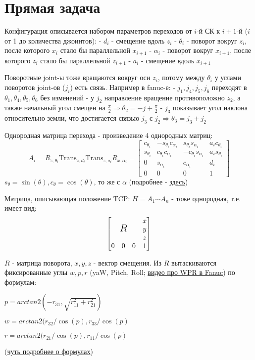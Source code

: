 \documentclass{article}
\begin{document}
\section{Прямая задача}

Конфигурация описывается набором параметров переходов от $i$-й СК к $i+1$-й ($i$ от 1 до количества джоинтов):
- $d_i$ - смещение вдоль $z_i$
- $\theta_i$ - поворот вокруг $z_i$, после которого $x_i$ стало бы параллельной $x_{i+1}$
- $\alpha_i$ - поворот вокруг $x_{i+1}$, после которого $z_i$ стало бы параллельной $z_{i+1}$
- $a_i$ - смещение вдоль $x_{i+1}$

Поворотные joint-ы тоже вращаются вокруг оси $z_i$, потому между $\theta_i$ у углами поворотов joint-ов ($j_i$) есть связь. Например в fanuc-е: 
- $j_1, j_4, j_5, j_6$ переходят в $\theta_1, \theta_4,\theta_5,\theta_6$ без изменений
- у $j_2$ направление вращение противоположно $z_2$, а также начальный угол смещен на $\frac{\pi}{2}\Rightarrow \theta_2=-j + \frac{\pi}{2}$
- $j_3$ показывает угол наклона относительно земли, что достигается связью $j_3$ с $j_2\Rightarrow \theta_3=j_3+j_2$

Однородная матрица перехода - произведение 4 однородных матриц: $$A_i = R_{z, \theta_i}\text{Trans}_{z, d_i}\text{Trans}_{z, a_i}R_{x,\alpha_i}=\begin{bmatrix}
c_{\theta_i} & -s_{\theta_i} c_{\alpha_i} & s_{\theta_i}s_{\alpha_i} & a_ic_{\theta_i}\\
s_{\theta_i} & c_{\theta_i} c_{\alpha_i} & -c_{\theta_i}s_{\alpha_i} & a_is_{\theta_i}\\
0 & s_{\alpha_i} & c_{\alpha_i} & d_i \\
0 & 0 & 0 & 1
\end{bmatrix}$$
$s_{\theta}=\sin(\theta), c_{\theta}=\cos(\theta)$, то же с $\alpha$ (подробнее - \href{https://uynitsuj.github.io/articles/2020-03/forward-kinematics-denavit-hartenberg-convention-on-a-6r-robotic-arm-example}{здесь})

Матрица, описывающая положение TCP: $H = A_1\cdots A_n$ - тоже однородная, т.е. имеет вид:
$$
\begin{bmatrix}
\text{\Large$R$}&\begin{matrix} x \\ y \\ z \end{matrix}\\
\begin{matrix} 0 & 0 & 0 \end{matrix} & 1
\end{bmatrix}
$$

$R$ - матрица поворота, $x, y, z$ - вектор смещения. Из $R$ вытаскиваются фиксированные углы $w, p, r$ (yaW, Pitch, Roll; \href{https://youtu.be/Ft7L5EsF_Kw?t=479}{видео про WPR в Fanuc}) по формулам:

$p=arctan2(-r_{31}, \sqrt{r_{11}^2+r_{21}^2})$

$w=arctan2(r_{32}/\cos(p), r_{33}/\cos(p)$

$r=arctan2(r_{21}/\cos(p), r_{11}/\cos(p)$

(\href{https://i.imgur.com/Bf728xV.png}{чуть подробнее о формулах})
\end{document}
